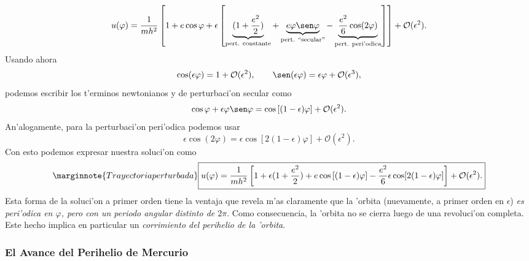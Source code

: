 \begin{equation}\label{solucasi}
 u(\varphi)=\frac{1}{mh^2}\left[1+e\cos\varphi+\epsilon\left[\underbrace{
(1+\frac { e^2 } { 2 } )}_\text{pert.
constante}+\underbrace{e\varphi\sen\varphi}_\text{pert. ``secular''}
-\underbrace{\frac{e^2 }{6} \cos(2\varphi)}_\text{pert. peri'odica}\right ]
\right ] +\mathcal{O}(\epsilon^2).
\end{equation}
Usando ahora
\begin{equation}
 \cos(\epsilon\varphi) =1+\mathcal{O}(\epsilon^2), \qquad
\sen(\epsilon\varphi) =\epsilon\varphi+\mathcal{O}(\epsilon^3),
\end{equation}
podemos escribir los t'erminos newtonianos y de perturbaci'on secular como
\begin{equation}
 \cos\varphi+\epsilon\varphi\sen\varphi=\cos\left[(1-\epsilon)\varphi\right]
+\mathcal{O}(\epsilon^2).
\end{equation}
An'alogamente, para la perturbaci'on peri'odica podemos usar
\begin{equation}
 \epsilon\cos(2\varphi)=\epsilon\cos\left[2(1-\epsilon)\varphi\right]+\mathcal{O}(\epsilon^2).
\end{equation}
Con esto podemos expresar nuestra soluci'on como
\begin{equation}\marginnote{Trayectoria perturbada}
 \boxed{u(\varphi)=\frac{1}{mh^2}\left[1+\epsilon(1+\frac { e^2 } { 2 }
)+e\cos\left[(1-\epsilon)\varphi\right] -\frac { e^2
}{6}\epsilon\cos[2(1-\epsilon)\varphi]\right ] +\mathcal{O}(\epsilon^2).} \label{solu1}
\end{equation}
Esta forma de la soluci'on a primer orden tiene la ventaja que revela m'as claramente que la 'orbita (nuevamente, a primer orden en $\epsilon$) \textit{es peri'odica en $\varphi$, pero con un periodo angular distinto de $2\pi$}. Como consecuencia, la 'orbita no se cierra luego de una revoluci'on completa. Este hecho implica en particular un \textit{corrimiento del perihelio de la 'orbita}.

\subsubsection{El Avance del Perihelio de Mercurio}

